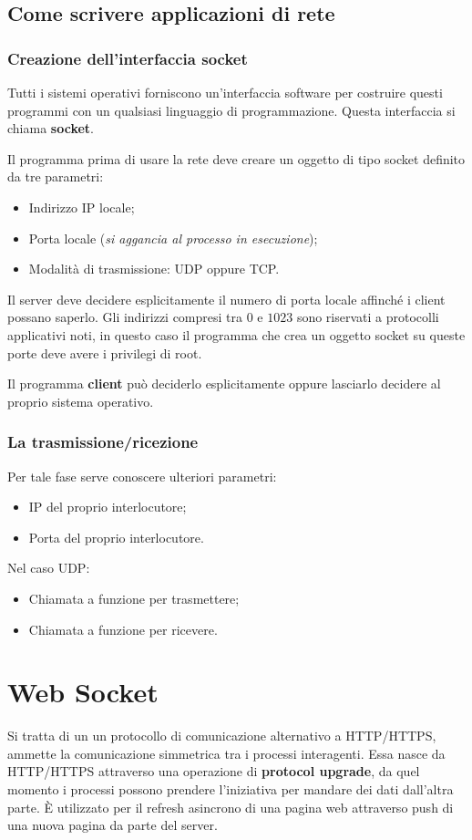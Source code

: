 \documentclass[oneside,a4paper,11pt]{book}
\theoremstyle{italicstyle}
\theoremstyle{normStyle}
\begin{document}
\subsection{Come scrivere applicazioni di rete}
\subsubsection{Creazione dell'interfaccia socket}
Tutti i sistemi operativi forniscono un'interfaccia software per 
costruire questi programmi con un qualsiasi linguaggio di programmazione.
Questa interfaccia si chiama \textbf{socket}.

Il programma prima di usare la rete deve creare un oggetto di tipo socket definito 
da tre parametri:
\begin{itemize}
  \item Indirizzo IP locale;
  \item Porta locale (\textit{si aggancia al processo in esecuzione});
  \item Modalità di trasmissione: UDP oppure TCP.
\end{itemize}

Il server deve decidere esplicitamente il numero di porta locale affinché i 
client possano saperlo. Gli indirizzi compresi tra $0$ e $1023$ sono riservati 
a protocolli applicativi noti, in questo caso il programma che crea un oggetto 
socket su queste porte deve avere i privilegi di root.

Il programma \textbf{client} può deciderlo esplicitamente oppure lasciarlo decidere 
al proprio sistema operativo.
\subsubsection{La trasmissione/ricezione}
Per tale fase serve conoscere ulteriori parametri:
\begin{itemize}
  \item IP del proprio interlocutore;
  \item Porta del proprio interlocutore.
\end{itemize}
Nel caso UDP:
\begin{itemize}
  \item Chiamata a funzione per trasmettere;
  \item Chiamata a funzione per ricevere.
\end{itemize}
\section{Web Socket}
Si tratta di un un protocollo di comunicazione alternativo a HTTP/HTTPS, ammette
la comunicazione simmetrica tra i processi interagenti. Essa nasce da 
HTTP/HTTPS attraverso una operazione di \textbf{protocol upgrade}, da quel 
momento i processi possono prendere l'iniziativa per mandare dei dati dall'altra 
parte. È utilizzato per il refresh asincrono di una pagina web attraverso push 
di una nuova pagina da parte del server.
\end{document}
